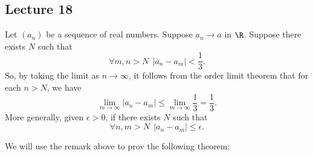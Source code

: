 

\subsection{Lecture 18}

 \begin{remark}\label{Useful Observation}
    Let \( ({a}_{n}) \) be a sequence of real numbers. Suppose \( {a}_{n} \to a  \) in \( \R  \). Suppose there exists \( N \) such that  
    \[  \forall m, n > N  \ \ | {a}_{n} - {a}_{m} | < \frac{ 1 }{ 3 }. \]
    So, by taking the limit as \( n \to \infty   \), it follows from the order limit theorem that for each \( n > N  \), we have 
    \[  \lim_{ m \to \infty  }  | {a}_{n} - {a}_{m} |  \leq \lim_{ m \to \infty  }  \frac{ 1 }{ 3 } = \frac{ 1 }{ 3 }. \]
    More generally, given \( \epsilon > 0  \), if there exists \( N  \) such that
    \[  \forall n,m > N \ \ | {a}_{n} - {a}_{m} |  \leq \epsilon. \]
 \end{remark}

 We will use the remark above to prov the following theorem: 

